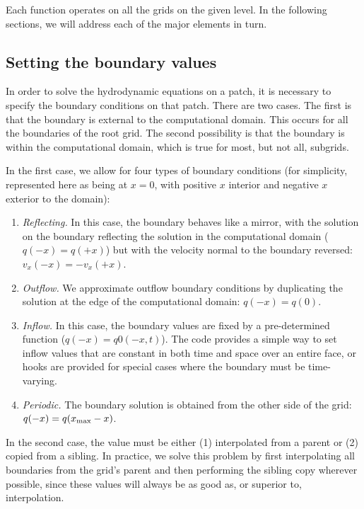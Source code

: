 Each function operates on all the grids on the given level.  In the following sections, we will address each of the major elements in turn.

\subsection{Setting the boundary values}
\label{sec:interpolation}

In order to solve the hydrodynamic equations on a patch, it is necessary to specify the boundary conditions on that patch.  There are two cases.  The first is that the boundary is external to the computational domain.  This occurs for all the boundaries of the root grid.  The second possibility is that the boundary is within the computational domain, which is true for most, but not all, subgrids.

In the first case, we allow for four types of boundary conditions
(for simplicity, represented here as being at $x=0$, with positive $x$ interior and
negative $x$ exterior to the domain):
\begin{enumerate}
  \item{\em Reflecting.} In this case, the boundary behaves like a mirror, with the solution on the boundary reflecting the solution in the computational domain ($q(-x) = q(+x)$) but with the velocity normal to the boundary reversed: $v_x(-x) = -v_x(+x)$.
  \item{\em Outflow.}  We approximate outflow boundary conditions by duplicating the solution at the edge of the computational domain: $q(-x) = q(0)$.
  \item{\em Inflow.} In this case, the boundary values are fixed by a pre-determined function ($q(-x) = q0(-x,t)$).  The code provides a simple way to set inflow values that are constant in both time and space over an entire face, or hooks are provided for special cases where the boundary must be time-varying.
  \item{\em Periodic.} The boundary solution is obtained from the other side of the grid: $q(-x) = q(x_{\rm{max}}-x)$.
\end{enumerate}

In the second case, the value must be either (1) interpolated from a parent or (2) copied from a sibling.  In practice, we solve this problem by first interpolating all boundaries from the grid's parent and then performing the sibling copy wherever possible, since these values will always be as good as, or superior to, interpolation.

